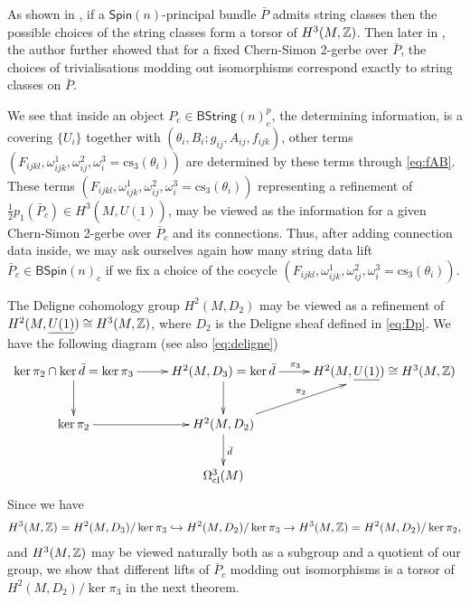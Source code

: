\documentclass[letterpaper,10pt, oneside]{article} %
\newcommand{\bstringnp}{\mathsf{BString}(n)^p_{c}} %
\newcommand{\Spin}{\mathsf{Spin}}%
\newcommand{\BSpin}{\mathsf{BSpin}}%
\newcommand{\cs}{\mathrm{cs}}
\newcommand{\half}{\frac{1}{2}}
\begin{document}

As shown in \cite{stolz-teichner:elliptic-obj}, if a $\Spin(n)$-principal bundle $\bar{P}$ admits string classes then the possible choices of the string classes form a torsor of $H^3(M, \mathbb Z)$. Then later in
\cite{waldorf:string-conn}, the author  further showed that for a fixed Chern-Simon 2-gerbe over $\bar{P}$, the choices of trivialisations modding out isomorphisms correspond exactly to string classes on $\bar{P}$.

We see that inside an object $P_c \in \bstringnp$, the determining information, is a covering $\{U_i\}$ together with $(\theta_i, B_i; g_{ij}, A_{ij}, f_{ijk})$, other terms $(F_{ijkl}, \omega^1_{ijk}, \omega^2_{ij}, \omega^3_{i}=\cs_3(\theta_i))$ are determined by these terms through \eqref{eq:fAB}. These terms $(F_{ijkl}, \omega^1_{ijk}, \omega^2_{ij}, \omega^3_{i}=\cs_3(\theta_i))$ representing a refinement of $\half p_1(\bar{P}_c) \in H^3(M, \underline{U(1)})$, may be viewed as the information for a given Chern-Simon 2-gerbe over $\bar{P}_c$ and its connections. Thus, after adding connection data inside, we may ask ourselves again how many string data lift $\bar{P}_c \in \BSpin(n)_c$  if we fix a choice of the cocycle $(F_{ijkl}, \omega^1_{ijk}, \omega^2_{ij}, \omega^3_{i}=\cs_3(\theta_i))$.


The Deligne cohomology group $H^2(M, D_2)$ may be viewed as a refinement of $H^2(M, \underline{U(1)})\cong H^3(M, \mathbb Z)$, where $D_2$ is the Deligne sheaf defined in \eqref{eq:Dp}. We have the following diagram (see also \eqref{eq:deligne})
\[\xymatrix{ \ker \pi_2 \cap \ker \bar{d} = \ker \pi_3  \ar[d]\ar[r] & H^2(M, D_3)=\ker \bar{d} \ar[d]\ar[r]^{\pi_3~\quad} & H^2(M, \underline{U(1)}) \cong H^3(M, \Z) \\
\ker \pi_2 \ar[r]& H^2(M, D_2) \ar[d]^{\bar{d}} \ar[ur]^{\pi_2} & \\
& \Omega_{\rm cl}^3(M) &
}
\]
Since we have
\begin{eqnarray*}H^3(M, \mathbb Z)=H^2(M, D_3)/\ker \pi_3
\hookrightarrow H^2(M, D_2) /\ker\pi_3 \to H^3(M, \mathbb Z)=H^2(M, D_2)/\ker \pi_2,
\end{eqnarray*}
and $H^3(M, \mathbb Z)$ may be viewed naturally both as a subgroup and a quotient of our group, we show that different lifts of $\bar{P}_c$ modding out isomorphisms is a torsor of $H^2(M, D_2)/\ker \pi_3 $  in the next theorem.

\end{document}
